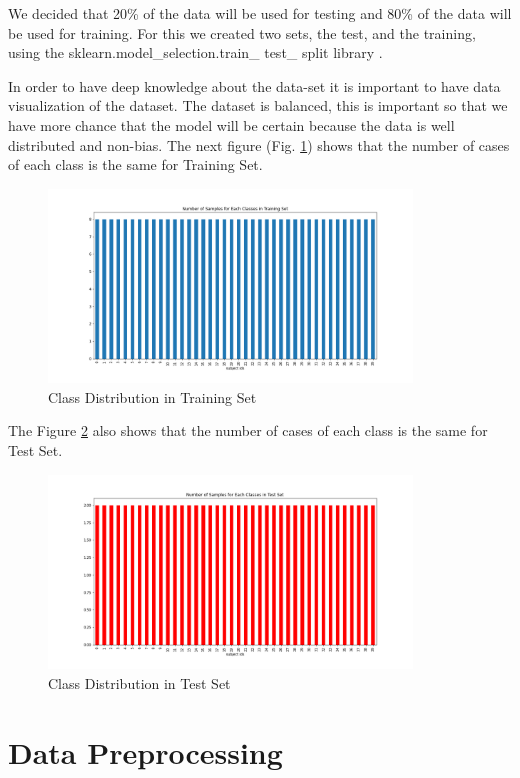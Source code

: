 \documentclass[conference]{IEEEtran}
\begin{document}
We decided that 20\% of the data will be used for testing and 80\% of the data will be used for training. For this we created two sets, the test, and the training, using the sklearn.model\_selection.train\_ test\_ split library \cite{train-test-split}.

In order to have deep knowledge about the data-set it is important to have data visualization of the dataset.
The dataset is balanced, this is important so that we have more chance that the model will be certain because the data is well distributed and non-bias. The next figure (Fig. \ref{img:samples_per_class_train}) shows that the number of cases of each class is the same for Training Set.

\begin{figure}[H]
    \centering
    \includegraphics[width=3.8in]{samples_per_class_train.png}
    \caption{Class Distribution in Training Set}
    \label{img:samples_per_class_train}
\end{figure}

The Figure \ref{img:samples_per_class_test.png} also shows that the number of cases of each class is the same for Test Set.

\begin{figure}[H]
    \centering
    \includegraphics[width=3.8in]{samples_per_class_test.png}
    \caption{Class Distribution in Test Set}
    \label{img:samples_per_class_test.png}
\end{figure}


\section{Data Preprocessing}
\end{document}
